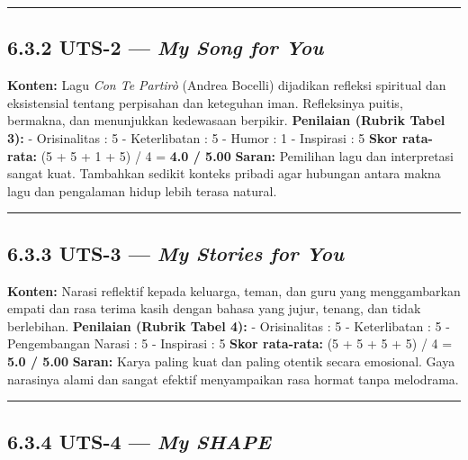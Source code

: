\documentclass[
  letterpaper,
  DIV=11,
  numbers=noendperiod]{scrreprt}
\begin{document}
\begin{center}\rule{0.5\linewidth}{0.5pt}\end{center}

\subsection{\texorpdfstring{6.3.2 UTS-2 --- \emph{My Song for
You}}{6.3.2 UTS-2 --- My Song for You}}\label{uts-2-my-song-for-you-1}

\textbf{Konten:} Lagu \emph{Con Te Partirò} (Andrea Bocelli) dijadikan
refleksi spiritual dan eksistensial tentang perpisahan dan keteguhan
iman. Refleksinya puitis, bermakna, dan menunjukkan kedewasaan berpikir.
\textbf{Penilaian (Rubrik Tabel 3):} - Orisinalitas : 5 - Keterlibatan :
5 - Humor : 1 - Inspirasi : 5 \textbf{Skor rata-rata:} (5 + 5 + 1 + 5) /
4 = \textbf{4.0 / 5.00} \textbf{Saran:} Pemilihan lagu dan interpretasi
sangat kuat. Tambahkan sedikit konteks pribadi agar hubungan antara
makna lagu dan pengalaman hidup lebih terasa natural.

\begin{center}\rule{0.5\linewidth}{0.5pt}\end{center}

\subsection{\texorpdfstring{6.3.3 UTS-3 --- \emph{My Stories for
You}}{6.3.3 UTS-3 --- My Stories for You}}\label{uts-3-my-stories-for-you-1}

\textbf{Konten:} Narasi reflektif kepada keluarga, teman, dan guru yang
menggambarkan empati dan rasa terima kasih dengan bahasa yang jujur,
tenang, dan tidak berlebihan. \textbf{Penilaian (Rubrik Tabel 4):} -
Orisinalitas : 5 - Keterlibatan : 5 - Pengembangan Narasi : 5 -
Inspirasi : 5 \textbf{Skor rata-rata:} (5 + 5 + 5 + 5) / 4 = \textbf{5.0
/ 5.00} \textbf{Saran:} Karya paling kuat dan paling otentik secara
emosional. Gaya narasinya alami dan sangat efektif menyampaikan rasa
hormat tanpa melodrama.

\begin{center}\rule{0.5\linewidth}{0.5pt}\end{center}

\subsection{\texorpdfstring{6.3.4 UTS-4 --- \emph{My
SHAPE}}{6.3.4 UTS-4 --- My SHAPE}}\label{uts-4-my-shape}
\end{document}
